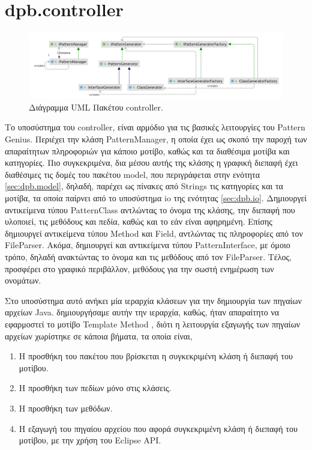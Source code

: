 \section{dpb.controller}
\label{sec:dpb.controller}
\begin{figure}[H]
    \centering
    \includegraphics[width=1.0\textwidth]{Figures/controller.png}
    \caption{Διάγραμμα UML Πακέτου controller.}
    \label{fig:controllerUML}
\end{figure}
\par
Το υποσύστημα του controller, είναι αρμόδιο για τις βασικές λειτουργίες του Pattern Genius. Περιέχει την κλάση PatternManager, 
η οποία έχει ως σκοπό την παροχή των απαραίτητων πληροφοριών για κάποιο μοτίβο, καθώς και τα διαθέσιμα μοτίβα και κατηγορίες. 
Πιο συγκεκριμένα, δια μέσου αυτής της κλάσης η γραφική διεπαφή έχει διαθέσιμες τις δομές του πακέτου model, που 
περιγράφεται στην ενότητα \ref{sec:dpb.model}, δηλαδή, παρέχει ως πίνακες από Strings τις κατηγορίες και τα μοτίβα, τα οποία παίρνει 
από το υποσύστημα io της ενότητας \ref{sec:dpb.io}. Δημιουργεί αντικείμενα τύπου PatternClass αντλώντας το όνομα της κλάσης, 
την διεπαφή που υλοποιεί, τις μεθόδους και πεδία, καθώς και το εάν είναι αφηρημένη. Επίσης δημιουργεί αντικείμενα τύπου Method και Field, 
αντλώντας τις πληροφορίες από τον FileParser. Ακόμα, δημιουργεί και αντικείμενα τύπου PatternInterface, με όμοιο τρόπο, 
δηλαδή ανακτώντας το όνομα και τις μεθόδους από τον FileParser. 
Τέλος, προσφέρει στο γραφικό περιβάλλον, μεθόδους για την σωστή ενημέρωση των ονομάτων.
\par
Στο υποσύστημα αυτό ανήκει μία ιεραρχία κλάσεων για την δημιουργία των πηγαίων αρχείων Java. δημιουργήσαμε αυτήν την ιεραρχία, καθώς,
ήταν απαραίτητο να εφαρμοστεί το μοτίβο Template Method \cite{GoF}, διότι η λειτουργία εξαγωγής των πηγαίων αρχείων χωρίστηκε σε κάποια βήματα, τα οποία είναι,
\newline
\begin{enumerate}
    \item Η προσθήκη του πακέτου που βρίσκεται η συγκεκριμένη κλάση ή διεπαφή του μοτίβου.
    \item Η προσθήκη των πεδίων μόνο στις κλάσεις. \label{enum:fields}
    \item Η προσθήκη των μεθόδων. \label{enum:methods}
    \item Η εξαγωγή του πηγαίου αρχείου που αφορά συγκεκριμένη κλάση ή διεπαφή του μοτίβου, με την χρήση του Eclipse API.
\end{enumerate}
